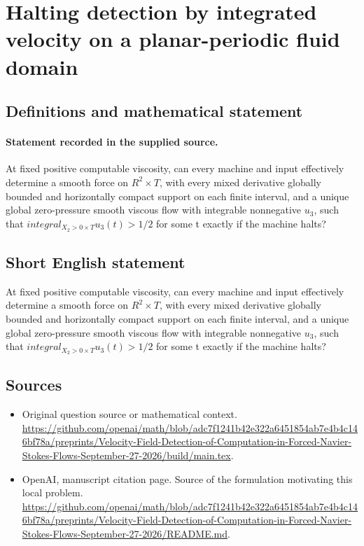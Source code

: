 \documentclass[11pt]{article}
\begin{document}
\section*{Halting detection by integrated velocity on a planar-periodic fluid domain}\label{30007324}
\subsection{Definitions and mathematical statement}
\paragraph{Statement recorded in the supplied source.}
At fixed positive computable viscosity, can every machine and input effectively determine a smooth force on $R^2×T$, with every mixed derivative globally bounded and horizontally compact support on each finite interval, and a unique global zero-pressure smooth viscous flow with integrable nonnegative $u_3$, such that $integral_{{X_2>0}×T}u_3(t)>1/2$ for some t exactly if the machine halts?
\subsection{Short English statement}
At fixed positive computable viscosity, can every machine and input effectively determine a smooth force on $R^2×T$, with every mixed derivative globally bounded and horizontally compact support on each finite interval, and a unique global zero-pressure smooth viscous flow with integrable nonnegative $u_3$, such that $integral_{{X_2>0}×T}u_3(t)>1/2$ for some t exactly if the machine halts?
\subsection{Sources}
\begin{itemize}
\item[S1] Original question source or mathematical context.
\url{https://github.com/openai/math/blob/adc7f1241b42e322a6451854ab7e4b4c146bf78a/preprints/Velocity-Field-Detection-of-Computation-in-Forced-Navier-Stokes-Flows-September-27-2026/build/main.tex}.
\item[S2] OpenAI, manuscript citation page. Source of the formulation motivating this local problem.
\url{https://github.com/openai/math/blob/adc7f1241b42e322a6451854ab7e4b4c146bf78a/preprints/Velocity-Field-Detection-of-Computation-in-Forced-Navier-Stokes-Flows-September-27-2026/README.md}.
\end{itemize}
\end{document}
